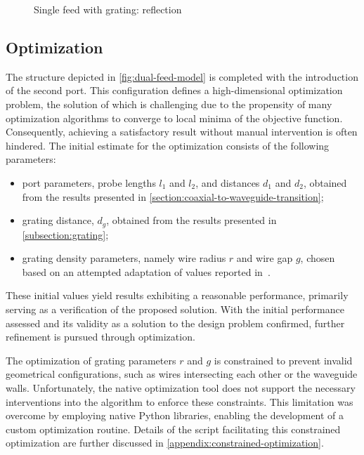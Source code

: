 \documentclass[11pt,a4paper,twoside,openany]{report}
\begin{document}
\begin{figure}[!ht]
    \centering
    
    \caption{\label{fig:single-feed-with-grating-reflection}Single feed with grating: reflection}
\end{figure}

\subsection{Optimization}
\label{subsection:dual-feed-optimization}
The structure depicted in \cref{fig:dual-feed-model} is completed with the introduction of the second port. This configuration defines a high-dimensional optimization problem, the solution of which is challenging due to the propensity of many optimization algorithms to converge to local minima of the objective function. Consequently, achieving a satisfactory result without manual intervention is often hindered. The initial estimate for the optimization consists of the following parameters:
\begin{itemize}
    \item port parameters, probe lengths $l_1$ and $l_2$, and distances $d_1$ and $d_2$, obtained from the results presented in \cref{section:coaxial-to-waveguide-transition};
    \item grating distance, $d_g$, obtained from the results presented in \cref{subsection:grating};
    \item grating density parameters, namely wire radius $r$ and wire gap $g$, chosen based on an attempted adaptation of values reported in~\parencite{karki-et-al:dual-polarized-probe-for-planar-near-field-measurement}.
\end{itemize}
These initial values yield results exhibiting a reasonable performance, primarily serving as a verification of the proposed solution. With the initial performance assessed and its validity as a solution to the design problem confirmed, further refinement is pursued through optimization.

The optimization of grating parameters $r$ and $g$ is constrained to prevent invalid geometrical configurations, such as wires intersecting each other or the waveguide walls. Unfortunately, the native optimization tool does not support the necessary interventions into the algorithm to enforce these constraints.  This limitation was overcome by employing native Python libraries, enabling the development of a custom optimization routine. Details of the script facilitating this constrained optimization are further discussed in \cref{appendix:constrained-optimization}.
\end{document}

